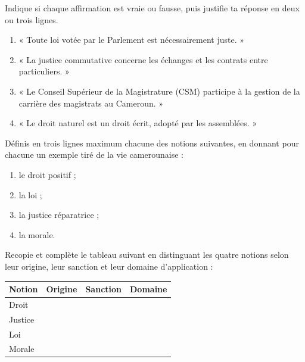 \documentclass[11pt]{article}
\newcounter{popsec}
\newcounter{popsub}
\newcommand{\courssub}[1]{%
  \stepcounter{popsub}%
  \par\vspace{9pt}\noindent{\popxbold\fontsize{11.5}{13}\selectfont\color{popink}{\color{poporange}\thepopsec.\thepopsub}\hspace{6pt}#1}\par\nopagebreak\vspace{4pt}
}
\begin{document}
\begin{exercice}
Indique si chaque affirmation est vraie ou fausse, puis justifie ta réponse en deux ou trois lignes.
\begin{enumerate}
\item « Toute loi votée par le Parlement est nécessairement juste. »
\item « La justice commutative concerne les échanges et les contrats entre particuliers. »
\item « Le Conseil Supérieur de la Magistrature (CSM) participe à la gestion de la carrière des magistrats au Cameroun. »
\item « Le droit naturel est un droit écrit, adopté par les assemblées. »
\end{enumerate}
\end{exercice}

\begin{exercice}
Définis en trois lignes maximum chacune des notions suivantes, en donnant pour chacune un exemple tiré de la vie camerounaise :
\begin{enumerate}
\item le droit positif ;
\item la loi ;
\item la justice réparatrice ;
\item la morale.
\end{enumerate}
\end{exercice}

\begin{exercice}
Recopie et complète le tableau suivant en distinguant les quatre notions selon leur origine, leur sanction et leur domaine d'application :
\begin{center}
\begin{tabularx}{\linewidth}{|l|X|X|X|}\hline
\rowcolor{popblueL} \textbf{Notion} & \textbf{Origine} & \textbf{Sanction} & \textbf{Domaine} \\ \hline
Droit & & & \\ \hline
Justice & & & \\ \hline
Loi & & & \\ \hline
Morale & & & \\ \hline
\end{tabularx}
\end{center}
\end{exercice}

\courssub{Je m'entraîne}
\end{document}
